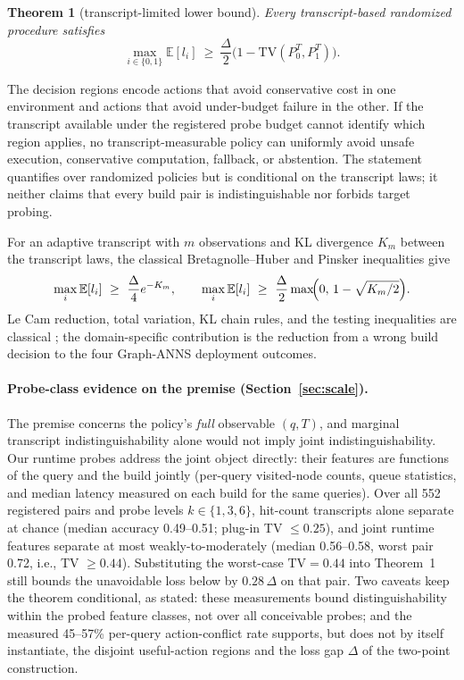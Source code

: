 \documentclass{article}
\newtheorem{theorem}{Theorem}
\newcommand{\TV}{\mathrm{TV}}
\newcommand{\E}{\mathbb{E}}
\begin{document}
\begin{theorem}[transcript-limited lower bound]
Every transcript-based randomized procedure satisfies
\begin{equation}
\max_{i\in\{0,1\}}\E[l_{i}]\ \ge\ \frac{\Delta}{2}\bigl(1-\TV(P_{0}^{T},P_{1}^{T})\bigr).
\label{eq:thm1}
\end{equation}
\end{theorem}

The decision regions encode actions that avoid conservative cost in one environment and actions that avoid
under-budget failure in the other. If the transcript available under the registered probe budget cannot
identify which region applies, no transcript-measurable policy can uniformly avoid unsafe execution,
conservative computation, fallback, or abstention. The statement quantifies over randomized policies but is
conditional on the transcript laws; it neither claims that every build pair is indistinguishable nor
forbids target probing.

For an adaptive transcript with $m$ observations and KL divergence $K_m$ between the transcript laws, the
classical Bretagnolle--Huber and Pinsker inequalities give
\begin{equation}
\max_{i}\E[l_{i}]\ \ge\ \frac{\Delta}{4}e^{-K_{m}},\qquad
\max_{i}\E[l_{i}]\ \ge\ \frac{\Delta}{2}\max\!\Bigl(0,\,1-\sqrt{K_{m}/2}\Bigr).
\label{eq:bh}
\end{equation}
Le Cam reduction, total variation, KL chain rules, and the testing inequalities are classical
\citep{yu1997assouad}; the domain-specific contribution is the reduction from a wrong build decision to the
four Graph-ANNS deployment outcomes.

\paragraph{Probe-class evidence on the premise (Section~\ref{sec:scale}).}
The premise concerns the policy's \emph{full} observable $(q,T)$, and marginal transcript indistinguishability
alone would not imply joint indistinguishability. Our runtime probes address the joint object directly: their
features are functions of the query and the build jointly (per-query visited-node counts, queue statistics,
and median latency measured on each build for the same queries). Over all 552 registered pairs and probe
levels $k\in\{1,3,6\}$, hit-count transcripts alone separate at chance (median accuracy 0.49--0.51;
plug-in TV $\le0.25$), and joint runtime features separate at most weakly-to-moderately (median 0.56--0.58,
worst pair 0.72, i.e., TV $\ge0.44$). Substituting the worst-case $\TV=0.44$ into Theorem~1 still bounds
the unavoidable loss below by $0.28\,\Delta$ on that pair. Two caveats keep the theorem conditional, as
stated: these measurements bound distinguishability within the probed feature classes, not over all
conceivable probes; and the measured 45--57\% per-query action-conflict rate supports, but does not by
itself instantiate, the disjoint useful-action regions and the loss gap $\Delta$ of the two-point
construction.
\end{document}
